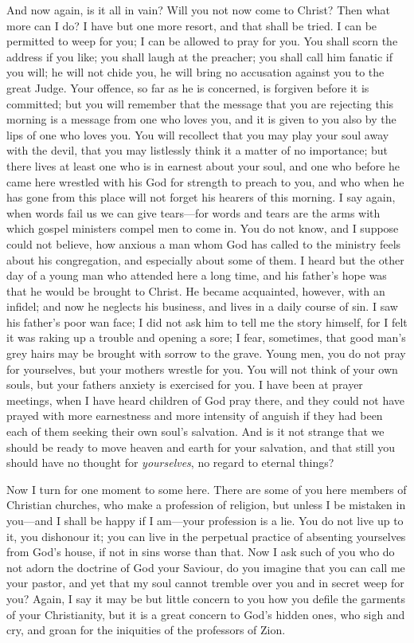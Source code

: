 \documentclass[
]{book}
\begin{document}
And now again, is it all in vain? Will you not now come to Christ? Then what more can I do? I have but one more resort, and that shall be tried. I can be permitted to weep for you; I can be allowed to pray for you. You shall scorn the address if you like; you shall laugh at the preacher; you shall call him fanatic if you will; he will not chide you, he will bring no accusation against you to the great Judge. Your offence, so far as he is concerned, is forgiven before it is committed; but you will remember that the message that you are rejecting this morning is a message from one who loves you, and it is given to you also by the lips of one who loves you. You will recollect that you may play your soul away with the devil, that you may listlessly think it a matter of no importance; but there lives at least one who is in earnest about your soul, and one who before he came here wrestled with his God for strength to preach to you, and who when he has gone from this place will not forget his hearers of this morning. I say again, when words fail us we can give tears---for words and tears are the arms with which gospel ministers compel men to come in. You do not know, and I suppose could not believe, how anxious a man whom God has called to the ministry feels about his congregation, and especially about some of them. I heard but the other day of a young man who attended here a long time, and his father's hope was that he would be brought to Christ. He became acquainted, however, with an infidel; and now he neglects his business, and lives in a daily course of sin. I saw his father's poor wan face; I did not ask him to tell me the story himself, for I felt it was raking up a trouble and opening a sore; I fear, sometimes, that good man's grey hairs may be brought with sorrow to the grave. Young men, you do not pray for yourselves, but your mothers wrestle for you. You will not think of your own souls, but your fathers anxiety is exercised for you. I have been at prayer meetings, when I have heard children of God pray there, and they could not have prayed with more earnestness and more intensity of anguish if they had been each of them seeking their own soul's salvation. And is it not strange that we should be ready to move heaven and earth for your salvation, and that still you should have no thought for \emph{yourselves}, no regard to eternal things?

Now I turn for one moment to some here. There are some of you here members of Christian churches, who make a profession of religion, but unless I be mistaken in you---and I shall be happy if I am---your profession is a lie. You do not live up to it, you dishonour it; you can live in the perpetual practice of absenting yourselves from God's house, if not in sins worse than that. Now I ask such of you who do not adorn the doctrine of God your Saviour, do you imagine that you can call me your pastor, and yet that my soul cannot tremble over you and in secret weep for you? Again, I say it may be but little concern to you how you defile the garments of your Christianity, but it is a great concern to God's hidden ones, who sigh and cry, and groan for the iniquities of the professors of Zion.
\end{document}
